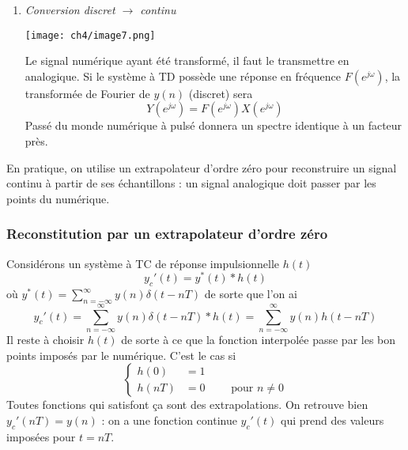 \begin{enumerate}
	\item \textit{Conversion discret $\rightarrow$ continu}
\begin{center}
		\texttt{[image: ch4/image7.png]}
\end{center}
	Le signal numérique ayant été transformé, il faut le transmettre en analogique. Si le système à 
	TD possède une réponse en fréquence $F(e^{j\omega})$, la transformée de Fourier de $y(n)$ (discret) 
	sera
	\begin{equation}
	Y(e^{j\omega}) = F(e^{j\omega})X(e^{j\omega})
	\end{equation}
	Passé du monde numérique à pulsé donnera un spectre identique à un facteur près.
	\end{enumerate}
	
	En pratique, on utilise un extrapolateur d'ordre zéro pour reconstruire un signal continu à 
	partir de ses échantillons : un signal analogique doit passer par les points du numérique.
	
		\subsubsection{Reconstitution par un extrapolateur d'ordre zéro}
		Considérons un système à TC de réponse impulsionnelle $h(t)$
		\begin{equation}
		y_c'(t) = y^*(t)*h(t)
		\end{equation}
		où $y^*(t) = \sum_{n=-\infty}^\infty y(n)\delta(t-nT)$ de sorte que l'on ai
		\begin{equation}
		y_c'(t) = \sum_{n=-\infty}^\infty y(n)\delta(t-nT)*h(t) = \sum_{n=-\infty}^\infty y(n)
		h(t-nT)
		\end{equation}
		Il reste à choisir $h(t)$ de sorte à ce que la fonction interpolée passe par les bon 
		points imposés par le numérique. C'est le cas si
		\begin{equation}
		\left\{\begin{array}{ll}
		h(0) &= 1\\
		h(nT) &= 0\qquad \text{ pour } n \neq 0
		\end{array}\right.
		\end{equation}
		Toutes fonctions qui satisfont ça sont des extrapolations. On retrouve bien $y_c'(nT)=y(n)$ 
		: on a une fonction continue $y_c'(t)$ qui prend des valeurs imposées pour $t=nT$.
		
		\ 
		
